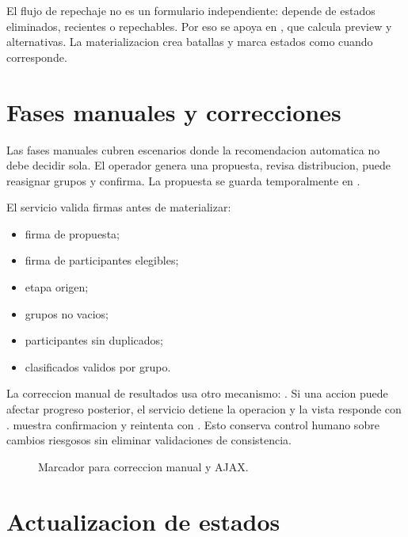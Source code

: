 El flujo de repechaje no es un formulario independiente: depende de estados eliminados, recientes o repechables. Por eso se apoya en , que calcula preview y alternativas. La materializacion crea batallas y marca estados como  cuando corresponde.

\section{Fases manuales y correcciones}
\label{sec:flujo-fases-manuales}

Las fases manuales cubren escenarios donde la recomendacion automatica no debe decidir sola. El operador genera una propuesta, revisa distribucion, puede reasignar grupos y confirma. La propuesta se guarda temporalmente en .

El servicio valida firmas antes de materializar:

\begin{itemize}
  \item firma de propuesta;
  \item firma de participantes elegibles;
  \item etapa origen;
  \item grupos no vacios;
  \item participantes sin duplicados;
  \item clasificados validos por grupo.
\end{itemize}

La correccion manual de resultados usa otro mecanismo: . Si una accion puede afectar progreso posterior, el servicio detiene la operacion y la vista responde con .  muestra confirmacion y reintenta con . Esto conserva control humano sobre cambios riesgosos sin eliminar validaciones de consistencia.

\begin{figure}[H]
  \centering
  \caption{Marcador para correccion manual y AJAX.}
  \label{fig:flujo-correccion-manual}
\end{figure}

\section{Actualizacion de estados}
\label{sec:flujo-estados}

